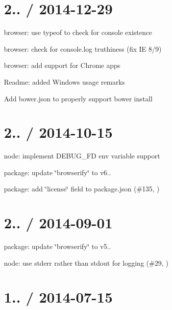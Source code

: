 \section*{2.. / 2014-\/12-\/29 }


\begin{DoxyItemize}
\item browser\+: use {\ttfamily typeof} to check for {\ttfamily console} existence
\item browser\+: check for {\ttfamily console.\+log} truthiness (fix IE 8/9)
\item browser\+: add support for Chrome apps
\item Readme\+: added Windows usage remarks
\item Add {\ttfamily bower.\+json} to properly support bower install
\end{DoxyItemize}

\section*{2.. / 2014-\/10-\/15 }


\begin{DoxyItemize}
\item node\+: implement {\ttfamily D\+E\+B\+U\+G\+\_\+\+FD} env variable support
\item package\+: update \char`\"{}browserify\char`\"{} to v6..
\item package\+: add \char`\"{}license\char`\"{} field to package.\+json (\#135, )
\end{DoxyItemize}

\section*{2.. / 2014-\/09-\/01 }


\begin{DoxyItemize}
\item package\+: update \char`\"{}browserify\char`\"{} to v5..
\item node\+: use stderr rather than stdout for logging (\#29, )
\end{DoxyItemize}

\section*{1.. / 2014-\/07-\/15 }


